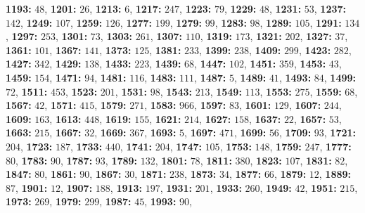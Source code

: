 \textsf{\bfseries 1193:} $48$, \textsf{\bfseries 1201:} $26$, \textsf{\bfseries 1213:} $6$, \textsf{\bfseries 1217:} $247$, \textsf{\bfseries 1223:} $79$, \textsf{\bfseries 1229:} $48$, 
\textsf{\bfseries 1231:} $53$, \textsf{\bfseries 1237:} $142$, \textsf{\bfseries 1249:} $107$, \textsf{\bfseries 1259:} $126$, \textsf{\bfseries 1277:} $199$, \textsf{\bfseries 1279:} $99$, \textsf{\bfseries 1283:} $98$, \textsf{\bfseries 1289:} $105$, \textsf{\bfseries 1291:} $134$, \textsf{\bfseries 1297:} $253$, \textsf{\bfseries 1301:} $73$, \textsf{\bfseries 1303:} $261$, \textsf{\bfseries 1307:} $110$, \textsf{\bfseries 1319:} $173$, \textsf{\bfseries 1321:} $202$, \textsf{\bfseries 1327:} $37$, \textsf{\bfseries 1361:} $101$, \textsf{\bfseries 1367:} $141$, \textsf{\bfseries 1373:} $125$, \textsf{\bfseries 1381:} $233$, \textsf{\bfseries 1399:} $238$, \textsf{\bfseries 1409:} $299$, \textsf{\bfseries 1423:} $282$, \textsf{\bfseries 1427:} $342$, \textsf{\bfseries 1429:} $138$, \textsf{\bfseries 1433:} $223$, \textsf{\bfseries 1439:} $68$, \textsf{\bfseries 1447:} $102$, \textsf{\bfseries 1451:} $359$, \textsf{\bfseries 1453:} $43$, \textsf{\bfseries 1459:} $154$, \textsf{\bfseries 1471:} $94$, \textsf{\bfseries 1481:} $116$, \textsf{\bfseries 1483:} $111$, \textsf{\bfseries 1487:} $5$, \textsf{\bfseries 1489:} $41$, \textsf{\bfseries 1493:} $84$, \textsf{\bfseries 1499:} $72$, \textsf{\bfseries 1511:} $453$, \textsf{\bfseries 1523:} $201$, \textsf{\bfseries 1531:} $98$, \textsf{\bfseries 1543:} $213$, \textsf{\bfseries 1549:} $113$, \textsf{\bfseries 1553:} $275$, \textsf{\bfseries 1559:} $68$, \textsf{\bfseries 1567:} $42$, \textsf{\bfseries 1571:} $415$, \textsf{\bfseries 1579:} $271$, \textsf{\bfseries 1583:} $966$, \textsf{\bfseries 1597:} $83$, \textsf{\bfseries 1601:} $129$, \textsf{\bfseries 1607:} $244$, \textsf{\bfseries 1609:} $163$, \textsf{\bfseries 1613:} $448$, \textsf{\bfseries 1619:} $155$, \textsf{\bfseries 1621:} $214$, \textsf{\bfseries 1627:} $158$, \textsf{\bfseries 1637:} $22$, \textsf{\bfseries 1657:} $53$, \textsf{\bfseries 1663:} $215$, \textsf{\bfseries 1667:} $32$, \textsf{\bfseries 1669:} $367$, \textsf{\bfseries 1693:} $5$, \textsf{\bfseries 1697:} $471$, \textsf{\bfseries 1699:} $56$, \textsf{\bfseries 1709:} $93$, \textsf{\bfseries 1721:} $204$, \textsf{\bfseries 1723:} $187$, \textsf{\bfseries 1733:} $440$, \textsf{\bfseries 1741:} $204$, \textsf{\bfseries 1747:} $105$, \textsf{\bfseries 1753:} $148$, \textsf{\bfseries 1759:} $247$, \textsf{\bfseries 1777:} $80$, \textsf{\bfseries 1783:} $90$, \textsf{\bfseries 1787:} $93$, \textsf{\bfseries 1789:} $132$, \textsf{\bfseries 1801:} $78$, \textsf{\bfseries 1811:} $380$, \textsf{\bfseries 1823:} $107$, \textsf{\bfseries 1831:} $82$, \textsf{\bfseries 1847:} $80$, \textsf{\bfseries 1861:} $90$, \textsf{\bfseries 1867:} $30$, \textsf{\bfseries 1871:} $238$, \textsf{\bfseries 1873:} $34$, \textsf{\bfseries 1877:} $66$, \textsf{\bfseries 1879:} $12$, \textsf{\bfseries 1889:} $87$, \textsf{\bfseries 1901:} $12$, \textsf{\bfseries 1907:} $188$, \textsf{\bfseries 1913:} $197$, \textsf{\bfseries 1931:} $201$, \textsf{\bfseries 1933:} $260$, \textsf{\bfseries 1949:} $42$, \textsf{\bfseries 1951:} $215$, \textsf{\bfseries 1973:} $269$, \textsf{\bfseries 1979:} $299$, \textsf{\bfseries 1987:} $45$, \textsf{\bfseries 1993:} $90$, 

